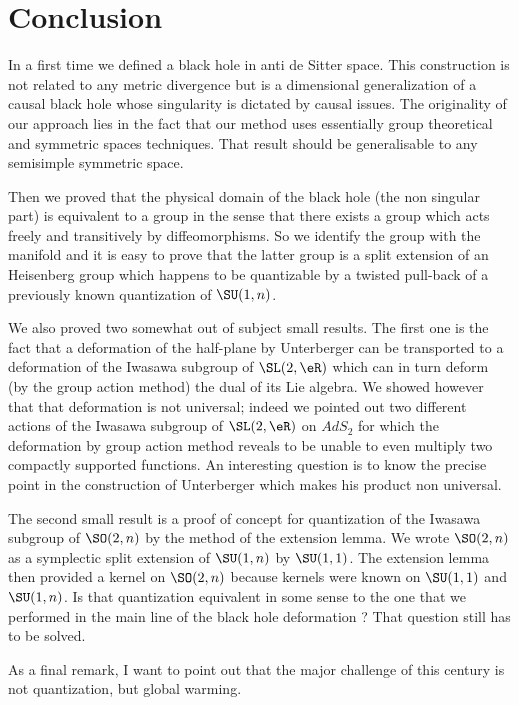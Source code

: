 
\section{Conclusion}

In a first time we defined a black hole in anti de Sitter space. This construction is not related to any metric divergence but is a dimensional generalization of a causal black hole whose singularity is dictated by causal issues. The originality of our approach lies in the fact that our method uses essentially group theoretical and symmetric spaces techniques. That result should be generalisable to any semisimple symmetric space.

Then we proved that the physical domain of the black hole (the non singular part) is equivalent to a group in the sense that there exists a group which acts freely and transitively by diffeomorphisms. So we identify the group with the manifold and it is easy to prove that the latter group is a split extension of an Heisenberg group which happens to be quantizable by a twisted pull-back of a previously known quantization of $\SU(1,n)$. 

We also proved two somewhat out of subject small results. The first one is the fact that a deformation of the half-plane by Unterberger can be transported to a deformation of the Iwasawa subgroup of $\SL(2,\eR)$ which can in turn deform (by the group action method) the dual of its Lie algebra. We  showed however that that deformation is not universal; indeed we pointed out two different actions of the Iwasawa subgroup of $\SL(2,\eR)$ on $AdS_2$ for which the deformation by group action method reveals to be unable to even multiply two compactly supported functions. An interesting question is to know the precise point in the construction of Unterberger which makes his product non universal.

The second small result is a proof of concept for quantization of the Iwasawa subgroup of $\SO(2,n)$ by the method of the extension lemma. We wrote $\SO(2,n)$ as a symplectic split extension of $\SU(1,n)$ by $\SU(1,1)$. The extension lemma then provided a kernel on $\SO(2,n)$ because kernels were known on $\SU(1,1)$ and $\SU(1,n)$. Is that quantization equivalent in some sense to the one that we performed in the main line of the black hole deformation ? That question still has to be solved.

As a final remark, I want to point out that the major challenge of this century is not quantization, but global warming.
